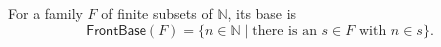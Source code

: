 \begin{definition}
For a family $F$ of finite subsets of $\mathbb N$, its base is
\[
\mathsf{FrontBase}(F)=\{n\in\mathbb N\mid \text{there is an }s\in F
\text{ with }n\in s\}.
\]
\end{definition}
